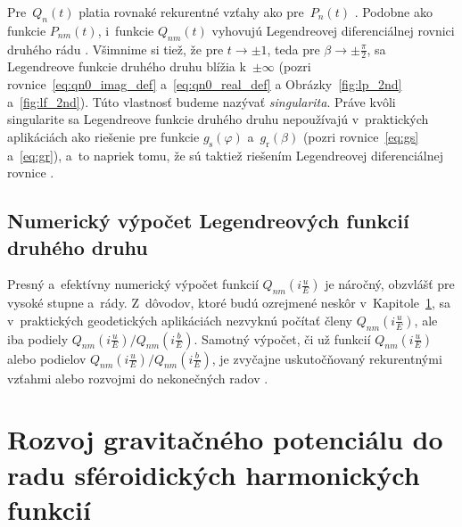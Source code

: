 \documentclass[a4paper,12pt]{book}
\begin{document}
Pre~$Q_n(t)$ platia rovnaké rekurentné vzťahy ako pre~$P_n(t)$ 
\parencite{MoritzPhysicalGeodesy}.  Podobne ako funkcie $P_{nm}(t)$, i~funkcie 
$Q_{nm}(t)$ vyhovujú Legendreovej diferenciálnej rovnici druhého rádu 
\parencite[pozri rovnicu
\ref{eq:legfunc1_differential_equation};][]{MoritzPhysicalGeodesy}.  Všimnime 
si tiež, že pre $t \rightarrow \pm 1$, teda pre $\beta \rightarrow \pm 
\frac{\pi}{2}$, sa Legendreove funkcie druhého druhu blížia k~$\pm \infty$ 
(pozri rovnice~\ref{eq:qn0_imag_def} a~\ref{eq:qn0_real_def} 
a Obrázky~\ref{fig:lp_2nd} a~\ref{fig:lf_2nd}).  Túto vlastnosť budeme nazývať 
\emph{singularita}.  Práve kvôli singularite sa Legendreove funkcie druhého 
druhu nepoužívajú v~praktických aplikáciách ako riešenie pre funkcie 
$g_\mathrm{s}(\varphi)$ a~$g_\mathrm{r}(\beta)$ (pozri rovnice~\ref{eq:gs} 
a~\ref{eq:gr}), a~to napriek tomu, že sú taktiež riešením Legendreovej 
diferenciálnej rovnice \parencite{MoritzPhysicalGeodesy}.


\subsection{Numerický výpočet Legendreových funkcií druhého druhu}

Presný a~efektívny numerický výpočet funkcií $Q_{nm}\left( i \frac{u}{E} 
\right)$ je náročný, obzvlášť pre vysoké stupne a~rády.  Z~dôvodov, ktoré budú 
ozrejmené neskôr v~Kapitole~\ref{sec:spheroidal_harmonic_expansion}, sa 
v~praktických geodetických aplikáciách nezvyknú počítať členy $Q_{nm}\left( 
i \frac{u}{E} \right)$, ale iba podiely $Q_{nm}\left( i \frac{u}{E} \right) 
\slash Q_{nm}\left( i \frac{b}{E} \right)$.  Samotný výpočet, či už funkcií 
$Q_{nm}\left( i \frac{u}{E} \right)$ alebo podielov $Q_{nm}\left( i \frac{u}{E} 
\right) \slash Q_{nm}\left( i \frac{b}{E} \right)$, je zvyčajne uskutočňovaný 
rekurentnými vzťahmi alebo rozvojmi do nekonečných radov \parencite[pozri 
napríklad][]{Sebera2012,Fukushima2013,Wang2013,Sprlak2020}.



\section{Rozvoj gravitačného potenciálu do radu sféroidických harmonických 
funkcií}
\label{sec:spheroidal_harmonic_expansion}
\end{document}
